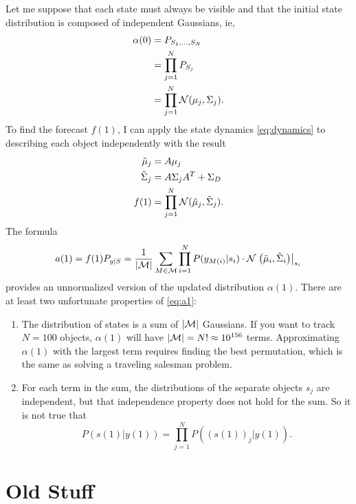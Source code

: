 \documentclass[12pt]{article}
\newcommand{\normal}[2]{{\cal N}(#1,#2)}
\newcommand{\NormalE}[3]{{\mathcal{N}}\left.\left(#1,#2\right)\right|_{#3}}
\newcommand{\M}{{\cal M}}
\begin{document}
Let me suppose that each state must always be visible and that the
initial state distribution is composed of independent Gaussians, ie,
\begin{align*}
  \alpha(0) &= P_{S_1,\ldots, S_N} \\
  &= \prod_{j=1}^N P_{S_j} \\
  &= \prod_{j=1}^N \normal{\mu_j}{\Sigma_j}.
\end{align*}
To find the forecast $f(1)$, I can apply the state dynamics
\eqref{eq:dynamics} to describing each object independently with the
result
\begin{align*}
  \tilde \mu_j &= A \mu_j \\
  \tilde \Sigma_j &= A \Sigma_j A^T + \Sigma_D \\
  f(1) &= \prod_{j=1}^N \normal{\tilde \mu_j}{ \tilde \Sigma_j}.
\end{align*}
The formula
\begin{equation}
  \label{eq:a1}
  a(1) = f(1) P_{y|S} = \frac{1}{\left| \M \right|} \sum_{M \in \M}
  \prod_{i=1}^N P(y_{M(i)}|s_i) \cdot \NormalE{\tilde \mu_i}{\tilde
    \Sigma_i}{s_i}
\end{equation}
provides an unnormalized version of the updated distribution
$\alpha(1)$.  There are at least two unfortunate properties of \eqref{eq:a1}:
\begin{enumerate}
\item The distribution of states is a sum of $\left| \M \right|$
  Gaussians.  If you want to track $N=100$ objects, $\alpha(1)$ will
  have $\left| \M \right| = N! \approx 10^{156}$ terms.  Approximating
  $\alpha(1)$ with the largest term requires finding the best
  permutation, which is the same as solving a traveling salesman
  problem.
\item For each term in the sum, the distributions of the separate
  objects $s_j$ are independent, but that independence property does
  not hold for the sum.  So it is not true that
  \begin{equation*}
    P(s(1)|y(1)) = \prod_{j=1}^N  P\left( \left( s(1) \right)_j|y(1)
    \right).
  \end{equation*}
\end{enumerate}

\section{Old Stuff}
\label{sec:old-stuff}
\end{document}

